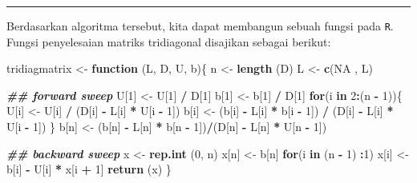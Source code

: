 \documentclass[
]{book}
\newenvironment{Shaded}{\begin{snugshade}}{\end{snugshade}}
\newcommand{\ConstantTok}[1]{\textcolor[rgb]{0.56,0.35,0.01}{#1}}
\newcommand{\ControlFlowTok}[1]{\textcolor[rgb]{0.13,0.29,0.53}{\textbf{#1}}}
\newcommand{\DecValTok}[1]{\textcolor[rgb]{0.00,0.00,0.81}{#1}}
\newcommand{\DocumentationTok}[1]{\textcolor[rgb]{0.56,0.35,0.01}{\textbf{\textit{#1}}}}
\newcommand{\FunctionTok}[1]{\textcolor[rgb]{0.13,0.29,0.53}{\textbf{#1}}}
\newcommand{\NormalTok}[1]{#1}
\newcommand{\OtherTok}[1]{\textcolor[rgb]{0.56,0.35,0.01}{#1}}
\newcommand{\SpecialCharTok}[1]{\textcolor[rgb]{0.81,0.36,0.00}{\textbf{#1}}}
\theoremstyle{definition}
\theoremstyle{definition}
\theoremstyle{definition}
\theoremstyle{definition}
\theoremstyle{remark}
\begin{document}
\begin{center}\rule{0.5\linewidth}{0.5pt}\end{center}

Berdasarkan algoritma tersebut, kita dapat membangun sebuah fungsi pada \texttt{R}. Fungsi penyelesaian matriks tridiagonal disajikan sebagai berikut:

\begin{Shaded}
\begin{Highlighting}[]
\NormalTok{tridiagmatrix }\OtherTok{\textless{}{-}} \ControlFlowTok{function}\NormalTok{ (L, D, U, b)\{}
\NormalTok{  n }\OtherTok{\textless{}{-}} \FunctionTok{length}\NormalTok{ (D)}
\NormalTok{  L }\OtherTok{\textless{}{-}} \FunctionTok{c}\NormalTok{(}\ConstantTok{NA}\NormalTok{ , L)}
  
  \DocumentationTok{\#\# forward sweep}
\NormalTok{  U[}\DecValTok{1}\NormalTok{] }\OtherTok{\textless{}{-}}\NormalTok{ U[}\DecValTok{1}\NormalTok{] }\SpecialCharTok{/}\NormalTok{ D[}\DecValTok{1}\NormalTok{]}
\NormalTok{  b[}\DecValTok{1}\NormalTok{] }\OtherTok{\textless{}{-}}\NormalTok{ b[}\DecValTok{1}\NormalTok{] }\SpecialCharTok{/}\NormalTok{ D[}\DecValTok{1}\NormalTok{]}
  \ControlFlowTok{for}\NormalTok{(i }\ControlFlowTok{in} \DecValTok{2}\SpecialCharTok{:}\NormalTok{(n }\SpecialCharTok{{-}} \DecValTok{1}\NormalTok{))\{}
\NormalTok{      U[i] }\OtherTok{\textless{}{-}}\NormalTok{ U[i] }\SpecialCharTok{/}\NormalTok{ (D[i] }\SpecialCharTok{{-}}\NormalTok{ L[i] }\SpecialCharTok{*}\NormalTok{ U[i }\SpecialCharTok{{-}} \DecValTok{1}\NormalTok{])}
\NormalTok{      b[i] }\OtherTok{\textless{}{-}}\NormalTok{ (b[i] }\SpecialCharTok{{-}}\NormalTok{ L[i] }\SpecialCharTok{*}\NormalTok{ b[i }\SpecialCharTok{{-}} \DecValTok{1}\NormalTok{]) }\SpecialCharTok{/}
\NormalTok{      (D[i] }\SpecialCharTok{{-}}\NormalTok{ L[i] }\SpecialCharTok{*}\NormalTok{ U[i }\SpecialCharTok{{-}} \DecValTok{1}\NormalTok{])}
\NormalTok{  \}}
\NormalTok{  b[n] }\OtherTok{\textless{}{-}}\NormalTok{ (b[n] }\SpecialCharTok{{-}}\NormalTok{ L[n] }\SpecialCharTok{*}\NormalTok{ b[n }\SpecialCharTok{{-}} \DecValTok{1}\NormalTok{])}\SpecialCharTok{/}\NormalTok{(D[n] }\SpecialCharTok{{-}}\NormalTok{ L[n] }\SpecialCharTok{*}\NormalTok{ U[n }\SpecialCharTok{{-}} \DecValTok{1}\NormalTok{])}
  
  \DocumentationTok{\#\# backward sweep}
\NormalTok{  x }\OtherTok{\textless{}{-}} \FunctionTok{rep.int}\NormalTok{ (}\DecValTok{0}\NormalTok{, n)}
\NormalTok{  x[n] }\OtherTok{\textless{}{-}}\NormalTok{ b[n]}
  \ControlFlowTok{for}\NormalTok{(i }\ControlFlowTok{in}\NormalTok{ (n }\SpecialCharTok{{-}} \DecValTok{1}\NormalTok{) }\SpecialCharTok{:}\DecValTok{1}\NormalTok{)}
\NormalTok{      x[i] }\OtherTok{\textless{}{-}}\NormalTok{ b[i] }\SpecialCharTok{{-}}\NormalTok{ U[i] }\SpecialCharTok{*}\NormalTok{ x[i }\SpecialCharTok{+} \DecValTok{1}\NormalTok{]}
  \FunctionTok{return}\NormalTok{ (x)}
\NormalTok{\}}
\end{Highlighting}
\end{Shaded}
\end{document}
